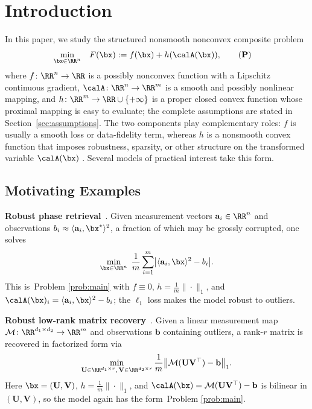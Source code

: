 \section{Introduction}
\label{sec:introduction}
In this paper, we study the structured nonsmooth nonconvex composite problem
\begin{align}
    \min_{\bx\in\RR^n}\quad & F(\bx) := f(\bx) + h(\calA(\bx)),
    \tag{\textbf{P}}
    \label{prob:main}
\end{align}
where $f\colon\RR^n\to\RR$ is a possibly nonconvex function with a Lipschitz
continuous gradient, $\calA\colon\RR^n\to\RR^m$ is a smooth and possibly nonlinear
mapping, and $h\colon\RR^m\to\RR\cup\{+\infty\}$ is a proper closed convex function
whose proximal mapping is easy to evaluate; the complete assumptions are stated in
Section~\ref{sec:assumptions}. The two components play complementary roles: $f$ is
usually a smooth loss or data-fidelity term, whereas $h$ is a nonsmooth convex function
that imposes robustness, sparsity, or other structure on the transformed variable
$\calA(\bx)$
\cite{charisopoulos2021low,markovsky2008structured,parekh2015convex}. Several models
of practical interest take this form.  

\subsection{Motivating Examples}

\textbf{Robust phase retrieval}~\cite{duchi2019solving}.
Given measurement vectors $\mathbf a_i\in\RR^n$ and observations
$b_i\approx\langle\mathbf a_i,\bx^\star\rangle^2$, a fraction of which may be grossly
corrupted, one solves
\begin{equation*}
  \min_{\bx\in\RR^n}\;\frac1m\sum_{i=1}^m
  \bigl|\langle\mathbf a_i,\bx\rangle^2-b_i\bigr|.
\end{equation*}
This is~Problem \eqref{prob:main} with $f\equiv0$, $h=\frac1m\|\cdot\|_1$, and
$\calA(\bx)_i=\langle\mathbf a_i,\bx\rangle^2-b_i$; the $\ell_1$ loss makes the
model robust to outliers.

\textbf{Robust low-rank matrix recovery}~\cite{charisopoulos2021low}.
Given a linear measurement map $\mathcal M\colon\RR^{d_1\times d_2}\to\RR^m$ and
observations $\mathbf b$ containing outliers, a rank-$r$ matrix is recovered in
factorized form via
\begin{equation*}
  \min_{\mathbf U\in\RR^{d_1\times r},\,\mathbf V\in\RR^{d_2\times r}}
  \frac1m\bigl\|\mathcal M(\mathbf U\mathbf V^\top)-\mathbf b\bigr\|_1.
\end{equation*}
Here $\bx=(\mathbf U,\mathbf V)$, $h=\frac1m\|\cdot\|_1$, and
$\calA(\bx)=\mathcal M(\mathbf U\mathbf V^\top)-\mathbf b$ is bilinear in
$(\mathbf U,\mathbf V)$, so the model again has the form~Problem \eqref{prob:main}.

